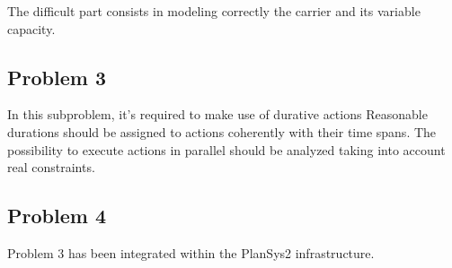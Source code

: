 The difficult part consists in modeling correctly the carrier and its variable capacity.

\subsection{Problem 3}
In this subproblem, it's required to make use of durative actions
Reasonable durations should be assigned to actions coherently with their time spans.
The possibility to execute actions in parallel should be analyzed taking into account real constraints.

\subsection{Problem 4}
Problem 3 has been integrated within the PlanSys2 infrastructure.

